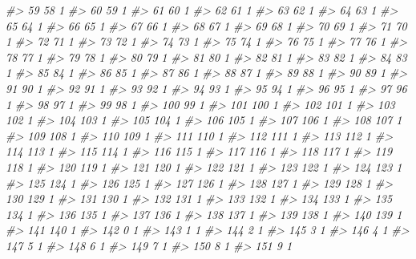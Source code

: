 \documentclass[]{article}
\newenvironment{Shaded}{\begin{snugshade}}{\end{snugshade}}
\newcommand{\CommentTok}[1]{\textcolor[rgb]{0.56,0.35,0.01}{\textit{#1}}}
\begin{document}
\begin{Shaded}
\begin{Highlighting}[]
\CommentTok{#> 59    58  1}
\CommentTok{#> 60    59  1}
\CommentTok{#> 61    60  1}
\CommentTok{#> 62    61  1}
\CommentTok{#> 63    62  1}
\CommentTok{#> 64    63  1}
\CommentTok{#> 65    64  1}
\CommentTok{#> 66    65  1}
\CommentTok{#> 67    66  1}
\CommentTok{#> 68    67  1}
\CommentTok{#> 69    68  1}
\CommentTok{#> 70    69  1}
\CommentTok{#> 71    70  1}
\CommentTok{#> 72    71  1}
\CommentTok{#> 73    72  1}
\CommentTok{#> 74    73  1}
\CommentTok{#> 75    74  1}
\CommentTok{#> 76    75  1}
\CommentTok{#> 77    76  1}
\CommentTok{#> 78    77  1}
\CommentTok{#> 79    78  1}
\CommentTok{#> 80    79  1}
\CommentTok{#> 81    80  1}
\CommentTok{#> 82    81  1}
\CommentTok{#> 83    82  1}
\CommentTok{#> 84    83  1}
\CommentTok{#> 85    84  1}
\CommentTok{#> 86    85  1}
\CommentTok{#> 87    86  1}
\CommentTok{#> 88    87  1}
\CommentTok{#> 89    88  1}
\CommentTok{#> 90    89  1}
\CommentTok{#> 91    90  1}
\CommentTok{#> 92    91  1}
\CommentTok{#> 93    92  1}
\CommentTok{#> 94    93  1}
\CommentTok{#> 95    94  1}
\CommentTok{#> 96    95  1}
\CommentTok{#> 97    96  1}
\CommentTok{#> 98    97  1}
\CommentTok{#> 99    98  1}
\CommentTok{#> 100   99  1}
\CommentTok{#> 101  100  1}
\CommentTok{#> 102  101  1}
\CommentTok{#> 103  102  1}
\CommentTok{#> 104  103  1}
\CommentTok{#> 105  104  1}
\CommentTok{#> 106  105  1}
\CommentTok{#> 107  106  1}
\CommentTok{#> 108  107  1}
\CommentTok{#> 109  108  1}
\CommentTok{#> 110  109  1}
\CommentTok{#> 111  110  1}
\CommentTok{#> 112  111  1}
\CommentTok{#> 113  112  1}
\CommentTok{#> 114  113  1}
\CommentTok{#> 115  114  1}
\CommentTok{#> 116  115  1}
\CommentTok{#> 117  116  1}
\CommentTok{#> 118  117  1}
\CommentTok{#> 119  118  1}
\CommentTok{#> 120  119  1}
\CommentTok{#> 121  120  1}
\CommentTok{#> 122  121  1}
\CommentTok{#> 123  122  1}
\CommentTok{#> 124  123  1}
\CommentTok{#> 125  124  1}
\CommentTok{#> 126  125  1}
\CommentTok{#> 127  126  1}
\CommentTok{#> 128  127  1}
\CommentTok{#> 129  128  1}
\CommentTok{#> 130  129  1}
\CommentTok{#> 131  130  1}
\CommentTok{#> 132  131  1}
\CommentTok{#> 133  132  1}
\CommentTok{#> 134  133  1}
\CommentTok{#> 135  134  1}
\CommentTok{#> 136  135  1}
\CommentTok{#> 137  136  1}
\CommentTok{#> 138  137  1}
\CommentTok{#> 139  138  1}
\CommentTok{#> 140  139  1}
\CommentTok{#> 141  140  1}
\CommentTok{#> 142    0  1}
\CommentTok{#> 143    1  1}
\CommentTok{#> 144    2  1}
\CommentTok{#> 145    3  1}
\CommentTok{#> 146    4  1}
\CommentTok{#> 147    5  1}
\CommentTok{#> 148    6  1}
\CommentTok{#> 149    7  1}
\CommentTok{#> 150    8  1}
\CommentTok{#> 151    9  1}

\end{Highlighting}
\end{Shaded}
\end{document}
